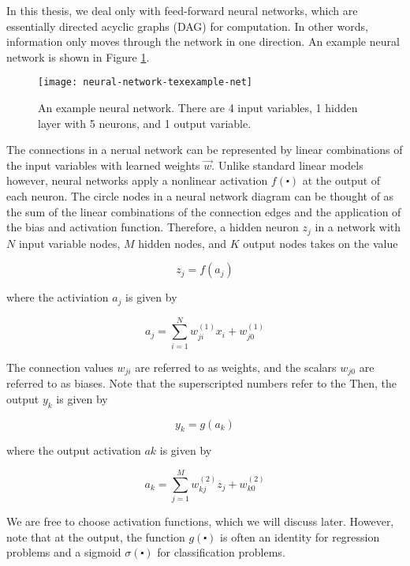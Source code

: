 In this thesis, we deal only with feed-forward neural networks, which are essentially directed acyclic graphs (DAG) for computation. In other words, information only moves through the network in one direction. An example neural network is shown in Figure \ref{fig:nn}.

\begin{figure}[!ht]
\centering
\texttt{[image: neural-network-texexample-net]}
\caption[Example neural network]{An example neural network. There are 4 input variables, 1 hidden layer with 5 neurons, and 1 output variable.}
\label{fig:nn}
\end{figure}

The connections in a nerual network can be represented by linear combinations of the input variables with learned weights $\vec{w}$. \cite{bishop} Unlike standard linear models however, neural networks apply a nonlinear activation $f(\centerdot)$ at the output of each neuron. The circle nodes in a neural network diagram can be thought of as the sum of the linear combinations of the connection edges and the application of the bias and activation function. Therefore, a hidden neuron $z_{j}$ in a network with $N$ input variable nodes, $M$ hidden nodes, and $K$ output nodes takes on the value

\begin{equation}
z_j = f(a_j)
\end{equation}

where the activiation $a_j$ is given by

\begin{equation}
a_j = \sum_{i=1}^{N} w_{ji}^{(1)}x_i + w_{j0}^{(1)}
\end{equation}

The connection values $w_{ji}$ are referred to as weights, and the scalars $w_{j0}$ are referred to as biases. Note that the superscripted numbers refer to the Then, the output $y_{k}$ is given by

\begin{equation}
y_k = g(a_k)
\end{equation}

where the output activation $a{k}$ is given by

\begin{equation}
a_k = \sum_{j=1}^{M} w_{kj}^{(2)} z_j + w_{k0}^{(2)}
\end{equation}

We are free to choose activation functions, which we will discuss later. However, note that at the output, the function $g(\centerdot)$ is often an identity for regression problems and a sigmoid $\sigma(\centerdot)$ for classification problems.

